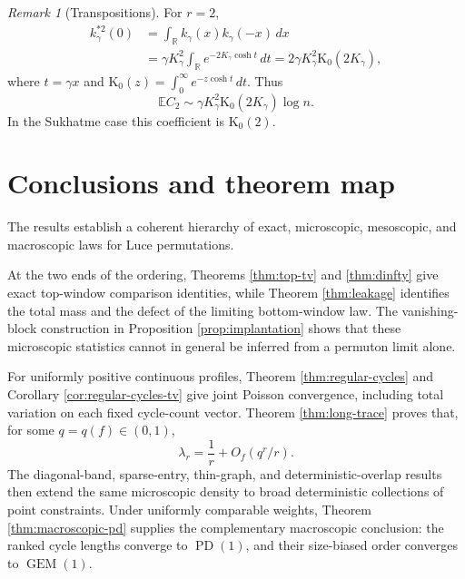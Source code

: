 \documentclass[11pt]{article}
\theoremstyle{remark}
\newtheorem{remark}[theorem]{Remark}
\newcommand{\Ee}{\mathbb E}
\newcommand{\dd}{\,d}
\begin{document}
\begin{remark}[Transpositions]
For $r=2$,
\[
\begin{aligned}
        k_\gamma^{*2}(0)
        &=\int_{\mathbb R}k_\gamma(x)k_\gamma(-x)\dd x\\
        &=\gamma K_\gamma^2
        \int_{\mathbb R}e^{-2K_\gamma\cosh t}\dd t
        =2\gamma K_\gamma^2\mathrm K_0(2K_\gamma),
\end{aligned}
\]
where $t=\gamma x$ and
$\mathrm K_0(z)=\int_0^\infty e^{-z\cosh t}\dd t$.  Thus
\[
        \Ee C_2\sim
        \gamma K_\gamma^2\mathrm K_0(2K_\gamma)\log n.
\]
In the Sukhatme case this coefficient is $\mathrm K_0(2)$.
\end{remark}

\section{Conclusions and theorem map}\label{sec:conclusions}

The results establish a coherent hierarchy of exact, microscopic, mesoscopic,
and macroscopic laws for Luce permutations.

At the two ends of the ordering, Theorems \ref{thm:top-tv} and
\ref{thm:dinfty} give exact top-window comparison identities, while Theorem
\ref{thm:leakage} identifies the total mass and the defect of the limiting
bottom-window law.  The vanishing-block construction in Proposition
\ref{prop:implantation} shows that these microscopic statistics cannot in
general be inferred from a permuton limit alone.

For uniformly positive continuous profiles, Theorem
\ref{thm:regular-cycles} and Corollary \ref{cor:regular-cycles-tv} give joint
Poisson convergence, including total variation on each fixed cycle-count
vector.  Theorem \ref{thm:long-trace} proves that, for some
$q=q(f)\in(0,1)$,
\[
        \lambda_r=\frac1r+O_f(q^r/r).
\]
The diagonal-band, sparse-entry, thin-graph, and deterministic-overlap results
then extend the same microscopic density to broad deterministic collections of
point constraints.  Under uniformly comparable weights, Theorem
\ref{thm:macroscopic-pd} supplies the complementary macroscopic conclusion:
the ranked cycle lengths converge to $\operatorname{PD}(1)$, and their
size-biased order converges to $\operatorname{GEM}(1)$.
\end{document}
